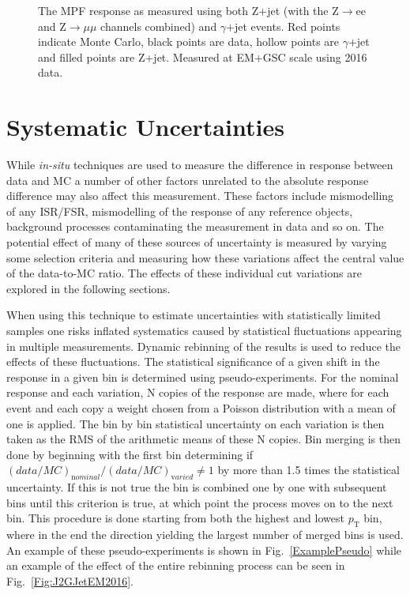 \begin{figure}[!ht]
\begin{center}
\end{center}
\caption[Comparing EM scale response between Z+jet and $\gamma$+jet]
{\small The MPF response as measured using both Z+jet (with the Z$\rightarrow$ee and Z$\rightarrow\mu\mu$ channels combined) and $\gamma$+jet events.  Red points indicate Monte Carlo, black points are data, hollow points are $\gamma$+jet and filled points are Z+jet.  Measured at EM+GSC scale using 2016 data.   }
\label{GammaZCompare2016EM}
\end{figure}


\section{Systematic Uncertainties}

While \textit {in-situ} techniques are used to measure the difference in response between data and MC a number of other factors unrelated to the absolute response difference may also affect this measurement.  
These factors include mismodelling of any ISR/FSR, mismodelling of the response of any reference objects, background processes contaminating the measurement in data and so on.  
The potential effect of many of these sources of uncertainty is measured by varying some selection criteria and measuring how these variations affect the central value of the data-to-MC ratio.  
The effects of these individual cut variations are explored in the following sections.  

When using this technique to estimate uncertainties with statistically limited samples one risks inflated systematics caused by statistical fluctuations appearing in multiple measurements.  
Dynamic rebinning of the results is used to reduce the effects of these fluctuations.  
The statistical significance of a given shift in the response in a given bin is determined using pseudo-experiments.  
For the nominal response and each variation, N copies of the response are made, where for each event and each copy a weight chosen from a Poisson distribution with a mean of one is applied.  
The bin by bin statistical uncertainty on each variation is then taken as the RMS of the arithmetic means of these N copies.  
Bin merging is then done by beginning with the first bin determining if $\left(data/MC\right)_{\mathrm nominal}/\left(data/MC\right)_{\mathrm varied}\neq1$ by more than 1.5 times the statistical uncertainty.  
If this is not true the bin is combined one by one with subsequent bins until this criterion is true, at which point the process moves on to the next bin.  
This procedure is done starting from both the highest and lowest $p_{\mathrm T}$ bin, where in the end the direction yielding the largest number of merged bins is used.  
An example of these pseudo-experiments is shown in Fig.~\ref{ExamplePseudo} while an example of the effect of the entire rebinning process can be seen in Fig.~\ref{Fig:J2GJetEM2016}.  %

